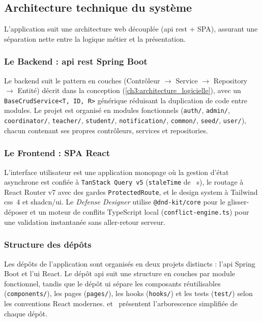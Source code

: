 \subsection{Architecture technique du système}
\label{ch4:architecture}

L'application suit une architecture web découplée (\acrshort{api} \acrshort{rest} + SPA), assurant une séparation nette entre la logique métier et la présentation.

\subsubsection{Le Backend : \acrshort{api} \acrshort{rest} Spring Boot}
\label{ch4:backend}

Le backend suit le pattern en couches (Contrôleur $\rightarrow$ Service $\rightarrow$ Repository $\rightarrow$ Entité) décrit dans la conception (\cref{ch3:architecture_logicielle}), avec un \texttt{BaseCrudService<T, ID, R>} générique réduisant la duplication de code entre modules. Le projet est organisé en  modules fonctionnels (\texttt{auth/}, \texttt{admin/}, \texttt{coordinator/}, \texttt{teacher/}, \texttt{student/}, \texttt{notification/}, \texttt{common/}, \texttt{seed/}, \texttt{user/}), chacun contenant ses propres contrôleurs, services et repositories.

\subsubsection{Le Frontend : SPA React}
\label{ch4:frontend}

L'interface utilisateur est une application monopage où la gestion d'état asynchrone est confiée à \texttt{TanStack Query v5} (\texttt{staleTime} de ~s), le routage à React Router v7 avec des gardes \texttt{ProtectedRoute}, et le design system à Tailwind \acrshort{css}~4 et shadcn/ui. Le \textit{Defense Designer} utilise \texttt{@dnd-kit/core} pour le glisser-déposer et un moteur de conflits TypeScript local (\texttt{conflict-engine.ts}) pour une validation instantanée sans aller-retour serveur.

\subsubsection{Structure des dépôts}
\label{ch4:repo_structure}

Les dépôts de l'application sont organisés en deux projets distincts : l'\acrshort{api} Spring Boot et l'\acrshort{ui} React. Le dépôt \acrshort{api} suit une structure en couches par module fonctionnel, tandis que le dépôt \acrshort{ui} sépare les composants réutilisables (\texttt{components/}), les pages (\texttt{pages/}), les hooks (\texttt{hooks/}) et les tests (\texttt{test/}) selon les conventions React modernes.  et~ présentent l'arborescence simplifiée de chaque dépôt.

